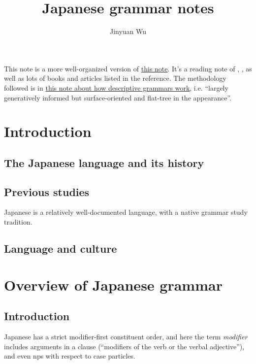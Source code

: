 \documentclass[UTF8, a4paper, oneside, scheme=plain]{ctexrep}
\title{Japanese grammar notes}
\author{Jinyuan Wu}
\newcommand*{\term}[1]{\emph{#1}}
\newcommand{\method}{\href{../methodology/glossing.pdf}{this note about how descriptive grammars work}}
\begin{document}
\maketitle

This note is a more well-organized version of \href{./japanese-note-1.pdf}{this note}.
It's a reading note of \citet{akiyama2012japanese}, \citet{tsutsui1989dictionary},
as well as lots of books and articles listed in the reference.
The methodology followed is in \method,
i.e. ``largely generatively informed but surface-oriented and flat-tree in the appearance''.

\chapter{Introduction}

\section{The Japanese language and its history}

\section{Previous studies}

Japanese is a relatively well-documented language,
with a native grammar study tradition.

\section{Language and culture}

\chapter{Overview of Japanese grammar}

\section{Introduction}\label{sec:overview-intro}

Japanese has a strict modifier-first constituent order,
and here the term \term{modifier} includes 
arguments in a clause (``modifiers of the verb or the verbal adjective''),
and even \acs{np}s with respect to case particles.
\end{document}

